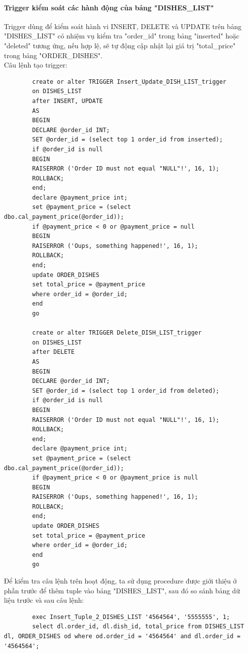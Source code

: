 \documentclass[13pt,a4paper]{article}
\begin{document}
	\paragraph{Trigger kiểm soát các hành động của bảng "DISHES\_LIST"\\}
	Trigger dùng để kiểm soát hành vi INSERT, DELETE và UPDATE trên bảng "DISHES\_LIST" có nhiệm vụ kiểm tra "order\_id" trong bảng "inserted" hoặc "deleted" tương ứng, nếu hợp lệ, sẽ tự động cập nhật lại giá trị "total\_price" trong bảng "ORDER\_DISHES". \\
	Câu lệnh tạo trigger:
	\begin{lstlisting}
		create or alter TRIGGER Insert_Update_DISH_LIST_trigger
		on DISHES_LIST
		after INSERT, UPDATE
		AS
		BEGIN
		DECLARE @order_id INT;
		SET @order_id = (select top 1 order_id from inserted);
		if @order_id is null
		BEGIN
		RAISERROR ('Order ID must not equal "NULL"!', 16, 1);
		ROLLBACK;
		end;
		declare @payment_price int;
		set @payment_price = (select dbo.cal_payment_price(@order_id));
		if @payment_price < 0 or @payment_price = null
		BEGIN
		RAISERROR ('Oups, something happened!', 16, 1);
		ROLLBACK;
		end;
		update ORDER_DISHES
		set total_price = @payment_price
		where order_id = @order_id;
		end
		go
		
		create or alter TRIGGER Delete_DISH_LIST_trigger
		on DISHES_LIST
		after DELETE
		AS
		BEGIN
		DECLARE @order_id INT;
		SET @order_id = (select top 1 order_id from deleted);
		if @order_id is null
		BEGIN
		RAISERROR ('Order ID must not equal "NULL"!', 16, 1);
		ROLLBACK;
		end;
		declare @payment_price int;
		set @payment_price = (select dbo.cal_payment_price(@order_id));
		if @payment_price < 0 or @payment_price is null
		BEGIN
		RAISERROR ('Oups, something happened!', 16, 1);
		ROLLBACK;
		end;
		update ORDER_DISHES
		set total_price = @payment_price
		where order_id = @order_id;
		end
		go
	\end{lstlisting}
	
	Để kiểm tra câu lệnh trên hoạt động, ta sử dụng procedure được giới thiệu ở phần trước để thêm tuple vào bảng "DISHES\_LIST", sau đó so sánh bảng dữ liệu trước và sau câu lệnh:
	\begin{lstlisting}
		exec Insert_Tuple_2_DISHES_LIST '4564564', '5555555', 1;
		select dl.order_id, dl.dish_id, total_price from DISHES_LIST dl, ORDER_DISHES od where od.order_id = '4564564' and dl.order_id = '4564564'; 
	\end{lstlisting}
	
\end{document}
